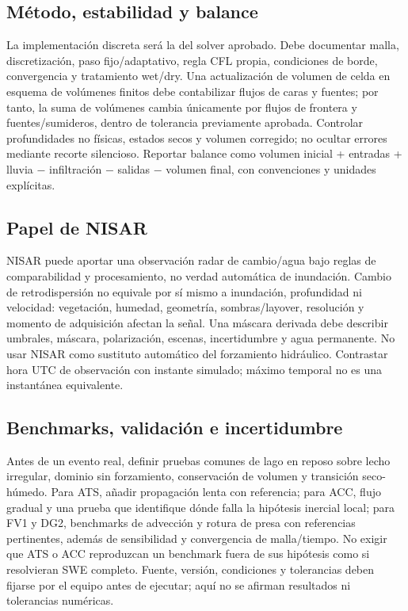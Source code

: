 \documentclass[11pt,a4paper]{article}
\begin{document}
\subsection{Método, estabilidad y balance}
La implementación discreta será la del solver aprobado. Debe documentar malla, discretización, paso fijo/adaptativo, regla CFL propia, condiciones de borde, convergencia y tratamiento wet/dry. Una actualización de volumen de celda en esquema de volúmenes finitos debe contabilizar flujos de caras y fuentes; por tanto, la suma de volúmenes cambia únicamente por flujos de frontera y fuentes/sumideros, dentro de tolerancia previamente aprobada. Controlar profundidades no físicas, estados secos y volumen corregido; no ocultar errores mediante recorte silencioso. Reportar balance como volumen inicial + entradas + lluvia $-$ infiltración $-$ salidas $-$ volumen final, con convenciones y unidades explícitas.

\subsection{Papel de NISAR}
NISAR puede aportar una observación radar de cambio/agua bajo reglas de comparabilidad y procesamiento, no verdad automática de inundación. Cambio de retrodispersión no equivale por sí mismo a inundación, profundidad ni velocidad: vegetación, humedad, geometría, sombras/layover, resolución y momento de adquisición afectan la señal. Una máscara derivada debe describir umbrales, máscara, polarización, escenas, incertidumbre y agua permanente. No usar NISAR como sustituto automático del forzamiento hidráulico. Contrastar hora UTC de observación con instante simulado; máximo temporal no es una instantánea equivalente.

\subsection{Benchmarks, validación e incertidumbre}
Antes de un evento real, definir pruebas comunes de lago en reposo sobre lecho irregular, dominio sin forzamiento, conservación de volumen y transición seco-húmedo. Para ATS, añadir propagación lenta con referencia; para ACC, flujo gradual y una prueba que identifique dónde falla la hipótesis inercial local; para FV1 y DG2, benchmarks de advección y rotura de presa con referencias pertinentes, además de sensibilidad y convergencia de malla/tiempo. No exigir que ATS o ACC reproduzcan un benchmark fuera de sus hipótesis como si resolvieran SWE completo. Fuente, versión, condiciones y tolerancias deben fijarse por el equipo antes de ejecutar; aquí no se afirman resultados ni tolerancias numéricas.
\end{document}
